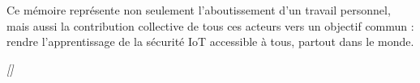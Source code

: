 Ce mémoire représente non seulement l'aboutissement d'un travail personnel, mais aussi la contribution collective de tous ces acteurs vers un objectif commun : rendre l'apprentissage de la sécurité IoT accessible à tous, partout dans le monde.

\vspace{1cm}

\begin{flushright}
\textit{[\auteur]}\\
\textit{\annee}
\end{flushright}